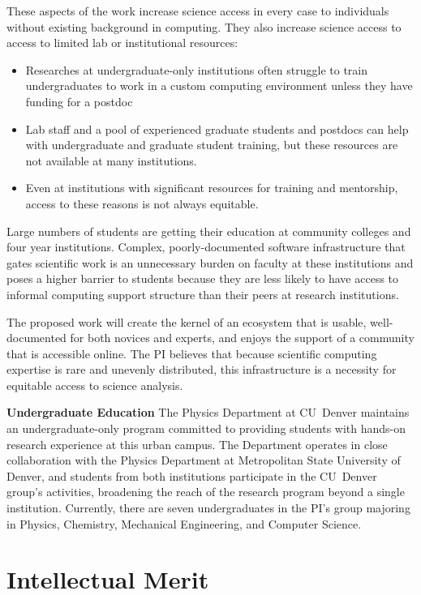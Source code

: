 These aspects of the work increase science access in every case to individuals without existing background in computing.  They also increase science access to access to limited lab or institutional resources: 

\begin{itemize}
    \item Researches at undergraduate-only institutions often struggle to train undergraduates to work in a custom computing environment unless they have funding for a postdoc
    \item Lab staff and a pool of experienced graduate students and postdocs can help with undergraduate and graduate student training, but these resources are not available at many institutions.
    \item Even at institutions with significant resources for training and mentorship, access to these reasons is not always equitable.  
\end{itemize}

Large numbers of students are getting their education at community colleges and four year institutions.  Complex, poorly-documented software infrastructure that gates scientific work is an unnecessary burden on faculty at these institutions and poses a higher barrier to students because they are less likely to have access to informal computing support structure than their peers at research institutions.

The proposed work will create the kernel of an ecosystem that is usable, well-documented for both novices and experts, and enjoys the support of a community that is accessible online.  The PI believes that because scientific computing expertise is rare and unevenly distributed, this infrastructure is a necessity for equitable access to science analysis.



\textbf{Undergraduate Education}
The Physics Department at CU~Denver maintains an undergraduate-only program committed to providing students with hands-on research experience at this urban campus. The Department operates in close collaboration with the Physics Department at Metropolitan State University of Denver, and students from both institutions participate in the CU~Denver group’s activities, broadening the reach of the research program beyond a single institution. Currently, there are seven undergraduates in the PI's group majoring in Physics, Chemistry,  Mechanical Engineering, and Computer Science.  


\section{Intellectual Merit}

